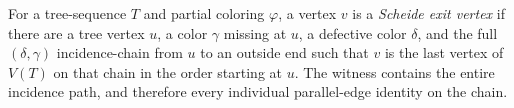 \begin{definition}
For a tree-sequence $T$ and partial coloring $\varphi$, a vertex $v$ is a
\emph{Scheide exit vertex} if there are a tree vertex $u$, a color
$\gamma$ missing at $u$, a defective color $\delta$, and the full
$(\delta,\gamma)$ incidence-chain from $u$ to an outside end such that
$v$ is the last vertex of $V(T)$ on that chain in the order starting at
$u$.  The witness contains the entire incidence path, and therefore every
individual parallel-edge identity on the chain.
\end{definition}
